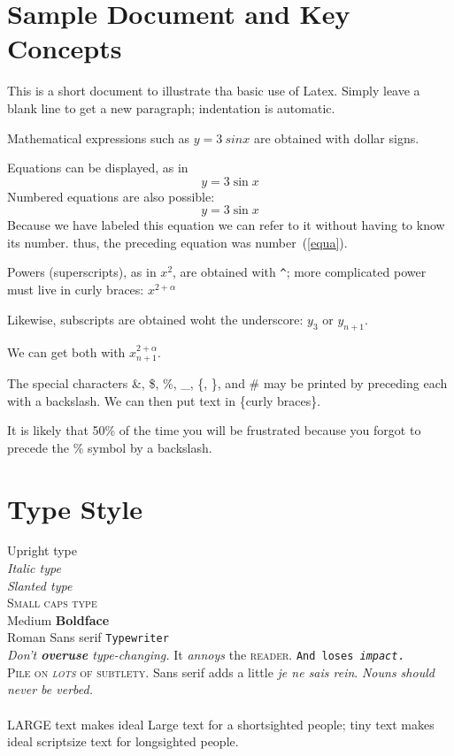 \documentclass{article}
\begin{document}
 
	
\section{Sample Document and Key Concepts}

This is a short document to illustrate tha basic use of Latex.
Simply leave a blank line to get a new paragraph; indentation is automatic.

Mathematical expressions such as $y = 3 \ sin x$ are obtained with dollar signs.

Equations can be displayed, as in
\[
	y = 3 \sin x
\]
Numbered equations are also possible:
\begin{equation}\label{equa}
	y = 3 \sin x
\end{equation}	
Because we have labeled this equation we can refer to it without having to know its number. thus, the preceding equation was
number~(\ref{equa}).

Powers (superscripts), as in $x^2$, are obtained with \verb"^"; more complicated power must live in curly braces: $x^{2+\alpha}$

Likewise, subscripts are obtained woht the underscore: $y_3$ or $y_{n+1}$.

We can get both with $x_{n+1}^{2+\alpha}$.

The special characters \&, \$, \%, \_, \{, \}, and \# may be printed by preceding each with a backslash. We can then put text in \{curly braces\}.

It is likely that 50\% of the time you will be frustrated because you forgot to precede the \% symbol by a backslash.

\section{Type Style}

\textup{Upright type}
\ \\ %
\textit{Italic type}
\ \\
\textsl{Slanted type}
\ \\
\textsc{Small caps type}
\ \\ 
\textmd{Medium} \textbf{Boldface}
\ \\
\textrm{Roman} \textsf{Sans serif} \texttt{Typewriter}
\ \\
\textsl{Don't \textbf{overuse} type-changing.}
\textsf{It \textit{annoys} the \textsc{reader}.}
\texttt{And loses \textsl{impact}.}
\ \\
\textsc{Pile on \emph{lots} of subtlety.}
\textsf{Sans serif adds a little  \emph{je ne sais rein}.}
\textsl{Nouns should \emph{never} be verbed.}
\ \\ \ \\
{\LARGE LARGE text} makes ideal
{\Large Large text} for
a shortsighted people;
{\tiny tiny text} makes
ideal {\scriptsize scriptsize text} for longsighted people.
\end{document}
